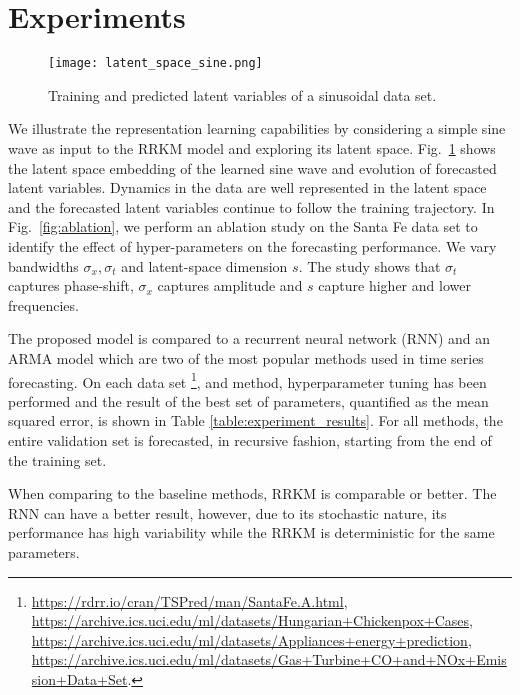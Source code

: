 \section{Experiments}
% 
\begin{figure}
	\vspace{-2ex}
	\texttt{[image: latent\_space\_sine.png]}
	\caption{Training and predicted latent variables of a sinusoidal data set.}
	\vspace{-2ex}
	\label{fig:sine_latent_space}
\end{figure}
We illustrate the representation learning capabilities by considering a simple sine wave as input to the RRKM model and exploring its latent space. Fig.~\ref{fig:sine_latent_space} shows the latent space embedding of the learned sine wave and evolution of forecasted latent variables. Dynamics in the data are well represented in the latent space and the forecasted latent variables continue to follow the training trajectory. In Fig.~\ref{fig:ablation}, we perform an ablation study on the Santa Fe data set to identify the effect of hyper-parameters on the forecasting performance. We vary bandwidths $\sigma_x , \sigma_t$ and latent-space dimension $s$. The study shows that $\sigma_t$ captures phase-shift, $\sigma_x$ captures amplitude and $s$ capture higher and lower frequencies.

The proposed model is compared to a recurrent neural network (RNN) and an ARMA model which are two of the most popular methods used in time series forecasting. On each data set \footnote{
	\url{https://rdrr.io/cran/TSPred/man/SantaFe.A.html}, \\
	\url{https://archive.ics.uci.edu/ml/datasets/Hungarian+Chickenpox+Cases},\\
	\url{https://archive.ics.uci.edu/ml/datasets/Appliances+energy+prediction},\\
	\url{https://archive.ics.uci.edu/ml/datasets/Gas+Turbine+CO+and+NOx+Emission+Data+Set}.
}, and method, hyperparameter tuning has been performed and the result of the best set of parameters, quantified as the mean squared error, is shown in Table \ref{table:experiment_results}. For all methods, the entire validation set is forecasted, in recursive fashion, starting from the end of the training set.

When comparing to the baseline methods, RRKM is comparable or better. The RNN can have a better result, however, due to its stochastic nature, its performance has high variability while the RRKM is deterministic for the same parameters.

